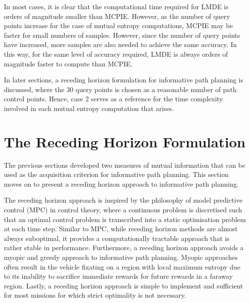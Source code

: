 		In most cases, it is clear that the computational time required for LMDE is orders of magnitude smaller than MCPIE. However, as the number of query points increase for the case of mutual entropy computations, MCPIE may be faster for small numbers of samples. However, since the number of query points have increased, more samples are also needed to achieve the same accuracy. In this way, for the same level of accuracy required, LMDE is always orders of magnitude faster to compute than MCPIE.
		
		In later sections, a receding horizon formulation for informative path planning is discussed, where the 30 query points is chosen as a reasonable number of path control points. Hence, case 2 serves as a reference for the time complexity involved in each mutual entropy computation that arises.

	\section{The Receding Horizon Formulation}
	\label{InformativeSeafloorExploration:RecedingHorizonFormulation}
	
		The previous sections developed two measures of mutual information that can be used as the acquisition criterion for informative path planning. This section moves on to present a receding horizon approach to informative path planning.
		
		The receding horizon approach is inspired by the philosophy of model predictive control (MPC) in control theory, where a continuous problem is discretised such that an optimal control problem is transcribed into a static optimisation problem at each time step. Similar to MPC, while receding horizon methods are almost always suboptimal, it provides a computationally tractable approach that is rather stable in performance. Furthermore, a receding horizon approach avoids a myopic and greedy approach to informative path planning. Myopic approaches often result in the vehicle fixating on a region with local maximum entropy due to its inability to sacrifice immediate rewards for future rewards in a faraway region. Lastly, a receding horizon approach is simple to implement and sufficient for most missions for which strict optimality is not necessary.
		

